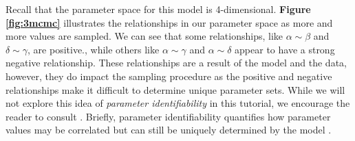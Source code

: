 \documentclass{article}
\begin{document}
Recall that the parameter space for this model is 4-dimensional. \textbf{Figure \ref{fig:3mcmc}} illustrates the relationships in our parameter space as more and more values are sampled. We can see that some relationships, like $\alpha \sim \beta$ and $\delta \sim \gamma$, are positive., while others like $\alpha \sim \gamma$ and $\alpha \sim \delta$ appear to have a strong negative relationship. These relationships are a result of the model and the data, however, they do impact the sampling procedure as the positive and negative relationships make it difficult to determine unique parameter sets. While we will not explore this idea of \emph{parameter identifiability} in this tutorial, we encourage the reader to consult \cite{smithCh8}. Briefly, parameter identifiability quantifies how parameter values may be correlated but can still be uniquely determined by the model \cite{smithCh8}.
\end{document}
